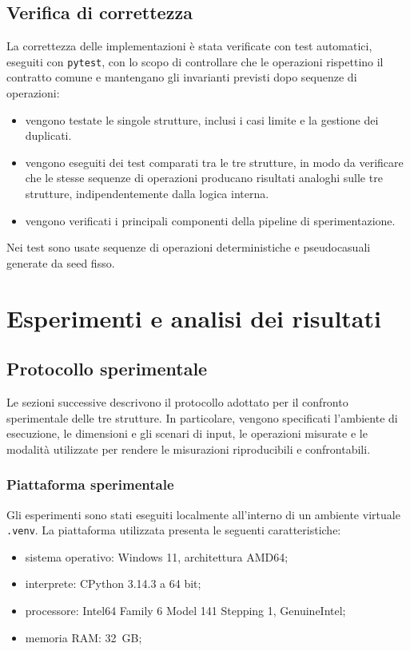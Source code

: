 \documentclass[a4paper,11pt]{article}
\begin{document}
\subsection{Verifica di correttezza}
La correttezza delle implementazioni è stata verificate con test automatici, eseguiti con \texttt{pytest}, con lo scopo di controllare che le operazioni rispettino il contratto comune e mantengano gli invarianti previsti dopo sequenze di operazioni: 
\begin{itemize}
    \item vengono testate le singole strutture, inclusi i casi limite e la gestione dei duplicati. 
    
    \item vengono eseguiti dei test comparati tra le tre strutture, in modo da verificare che le stesse sequenze di operazioni producano risultati analoghi sulle tre strutture, indipendentemente dalla logica interna.
    
    \item vengono verificati i principali componenti della pipeline di sperimentazione.
\end{itemize}

Nei test sono usate sequenze di operazioni deterministiche e pseudocasuali generate da seed fisso. 


\clearpage
\section{Esperimenti e analisi dei risultati}


\subsection{Protocollo sperimentale}
Le sezioni successive descrivono il protocollo adottato per il confronto sperimentale delle tre strutture. In particolare, vengono specificati l'ambiente di esecuzione, le dimensioni e gli scenari di input, le operazioni misurate e le modalità utilizzate per rendere le misurazioni riproducibili e confrontabili.


\subsubsection{Piattaforma sperimentale}
Gli esperimenti sono stati eseguiti localmente all'interno di un ambiente virtuale \texttt{.venv}. La piattaforma utilizzata presenta le seguenti caratteristiche:
\begin{itemize}
    \item sistema operativo: Windows 11, architettura AMD64;
    
    \item interprete: CPython 3.14.3 a 64 bit;
    
    \item processore: Intel64 Family 6 Model 141 Stepping 1,
    GenuineIntel;

    \item memoria RAM: 32~GB;
\end{itemize}
\end{document}
